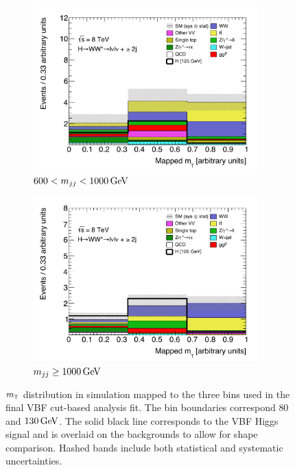 \begin{figure}[h!]
  \centering
  \captionsetup{justification=centering}

   \begin{subfigure}[t]{0.5\textwidth}
        \centering
        \includegraphics[width=0.95\textwidth]{figures/Mapped_MT_lowMjj}
        \caption{$600 < \mjj < 1000 \GeV$}
    \end{subfigure}%
    \begin{subfigure}[t]{0.5\textwidth}
        \centering
        \includegraphics[width=0.95\textwidth]{figures/Mapped_MT_highMjj}
        \caption{$\mjj \geq 1000 \GeV$}
    \end{subfigure}

   \caption{$m_{\textrm{\footnotesize\sc t}}$ distribution in simulation mapped to the three bins used in the final VBF cut-based analysis fit. The bin boundaries correspond $80$ and $130 \GeV$. The solid black line corresponds to the VBF Higgs signal and is overlaid on the backgrounds to allow for shape comparison. Hashed bands include both statistical and systematic uncertainties.}
  \label{fig:VBF_mapped_mT}
\end{figure}

